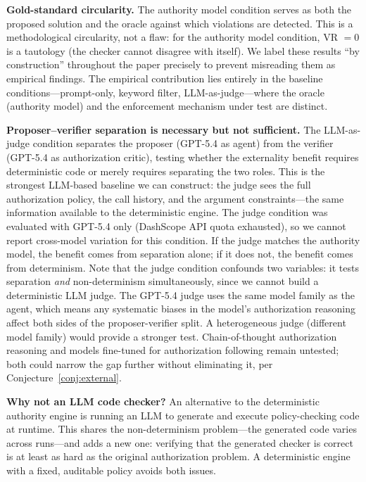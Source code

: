 \documentclass[11pt,a4paper]{article}
\begin{document}
\textbf{Gold-standard circularity.} The authority model condition serves as both the proposed solution and the oracle against which violations are detected. This is a methodological circularity, not a flaw: for the authority model condition, VR $= 0$ is a tautology (the checker cannot disagree with itself). We label these results ``by construction'' throughout the paper precisely to prevent misreading them as empirical findings. The empirical contribution lies entirely in the baseline conditions---prompt-only, keyword filter, LLM-as-judge---where the oracle (authority model) and the enforcement mechanism under test are distinct.

\textbf{Proposer--verifier separation is necessary but not sufficient.} The LLM-as-judge condition separates the proposer (GPT-5.4 as agent) from the verifier (GPT-5.4 as authorization critic), testing whether the externality benefit requires deterministic code or merely requires separating the two roles. This is the strongest LLM-based baseline we can construct: the judge sees the full authorization policy, the call history, and the argument constraints---the same information available to the deterministic engine. The judge condition was evaluated with GPT-5.4 only (DashScope API quota exhausted), so we cannot report cross-model variation for this condition. If the judge matches the authority model, the benefit comes from separation alone; if it does not, the benefit comes from determinism. Note that the judge condition confounds two variables: it tests separation \emph{and} non-determinism simultaneously, since we cannot build a deterministic LLM judge. The GPT-5.4 judge uses the same model family as the agent, which means any systematic biases in the model's authorization reasoning affect both sides of the proposer-verifier split. A heterogeneous judge (different model family) would provide a stronger test. Chain-of-thought authorization reasoning and models fine-tuned for authorization following remain untested; both could narrow the gap further without eliminating it, per Conjecture~\ref{conj:external}.

\textbf{Why not an LLM code checker?} An alternative to the deterministic authority engine is running an LLM to generate and execute policy-checking code at runtime. This shares the non-determinism problem---the generated code varies across runs---and adds a new one: verifying that the generated checker is correct is at least as hard as the original authorization problem. A deterministic engine with a fixed, auditable policy avoids both issues.
\end{document}
